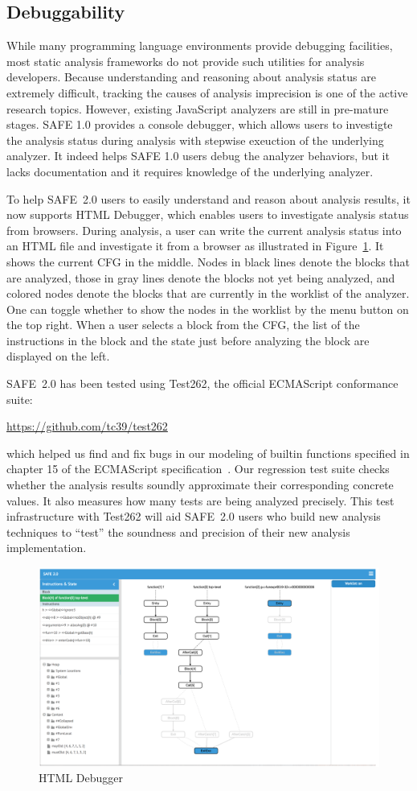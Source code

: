 \documentclass[10pt, conference]{IEEEtran}
\newcommand{\oldsafe}{{SAFE 1.0}\xspace}
\newcommand{\safe}{{SAFE~2.0}\xspace}
\newcommand{\htmldebug}{{\sf\small HTML Debugger}\xspace}
\begin{document}
\subsection{Debuggability}
While many programming language environments provide debugging
facilities, most static analysis frameworks do not provide such utilities
for analysis developers.  Because understanding and reasoning about
analysis status are extremely difficult, tracking the causes of analysis
imprecision is one of the active research topics.  However, existing
JavaScript analyzers are still in pre-mature stages.  \oldsafe provides
a console debugger, which allows users to investigte the analysis status
during analysis with stepwise exeuction of the underlying analyzer.
It indeed helps \oldsafe users debug the analyzer behaviors, but it lacks
documentation and it requires knowledge of the underlying analyzer.


To help \safe users to easily understand and reason about
analysis results, it now supports \htmldebug, which enables users
to investigate analysis status from browsers.  During analysis,
a user can write the current analysis status into an HTML file and
investigate it from a browser as illustrated in
Figure~\ref{fig:htmldebug}.  It shows the current CFG in the middle.
Nodes in black lines denote the blocks that are analyzed, those in
gray lines denote the blocks not yet being analyzed, and colored nodes
denote the blocks that are currently in the worklist of the analyzer.
One can toggle whether to show the nodes in the worklist by the menu
button on the top right.
When a user selects a block from the CFG, the list of the instructions in
the block and the state just before analyzing the block are displayed
on the left.


\safe has been tested using Test262, the official ECMAScript
conformance suite:
\begin{center}
\url{https://github.com/tc39/test262}
\end{center}
which helped us find and fix bugs in our modeling of builtin
functions specified in chapter 15 of the ECMAScript
specification~\cite{ECMA}.  Our regression test suite checks
whether the analysis results soundly approximate their corresponding
concrete values.  It also measures how many tests are being analyzed
precisely.  This test infrastructure with Test262 will aid \safe users
who build new analysis techniques to ``test'' the soundness and precision of their
new analysis implementation.


\begin{figure}[t]
\centering
\includegraphics[width=.7\textwidth]{htmldebugger.png}
\caption{\htmldebug}\label{fig:htmldebug}
\end{figure}
\end{document}
